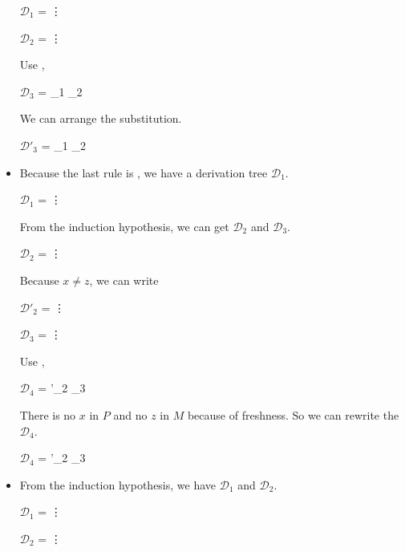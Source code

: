 \begin{itemize}
	$\mathcal{D}_1$ = 
	{\vdots}

	$\mathcal{D}_2$ = 
	{\vdots}

	Use \KAbs,

	$\mathcal{D}_3$ = 
	{_1 \andalso {}_2}

	We can arrange the substitution.

	$\mathcal{D}'_3$ = 
	{_1 \andalso {}_2}

	\item \KApp

	Because the last rule is \KApp, we have a derivation tree $\mathcal{D}_1$.

	$\mathcal{D}_1$ = 
	{ \andalso
		{\vdots}}

	From the induction hypothesis, we can get $\mathcal{D}_2$ and $\mathcal{D}_3$.

	$\mathcal{D}_2$ = 
	{\vdots}

	Because $x \neq z$, we can write

	$\mathcal{D}'_2$ = 
	{\vdots}

	$\mathcal{D}_3$ = 
	{\vdots}

	Use \KApp,

	$\mathcal{D}_4$ = 
	{'_2 \andalso {}_3}

	There is no $x$ in $P$ and no $z$ in $M$ because of freshness. So we can rewrite the $\mathcal{D}_4$.

	$\mathcal{D}_4$ = 
	{'_2 \andalso {}_3}

	\item \KConv

	From the induction hypothesis, we have $\mathcal{D}_1$ and $\mathcal{D}_2$.

	$\mathcal{D}_1$ = 
	{\vdots}

	$\mathcal{D}_2$ = 
	{\vdots}


\end{itemize}
